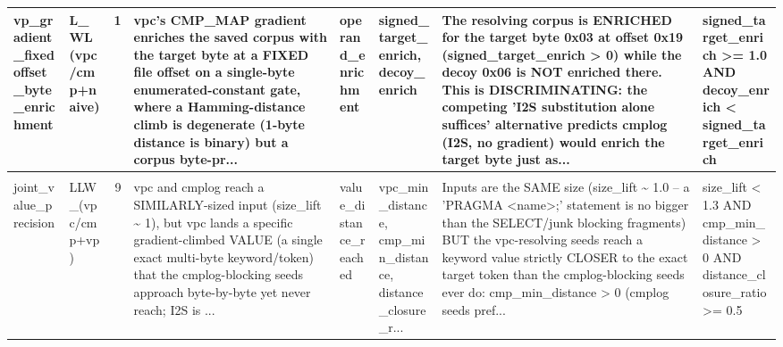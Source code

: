 \documentclass[7pt]{extarticle}
\begin{document}
{\begin{longtable}{@{}p{2.4cm}p{1.9cm}rp{4.3cm}p{1.5cm}p{1.7cm}p{4.6cm}p{3.0cm}@{}}
vp\_\allowbreak gradient\_\allowbreak fixedoffset\_\allowbreak byte\_\allowbreak enrichment & L\_\allowbreak WL (vpc/cmp+naive) & 1 & vpc's CMP\_\allowbreak MAP gradient enriches the saved corpus with the target byte at a FIXED file offset on a single-byte enumerated-constant gate, where a Hamming-distance climb is degenerate (1-byte distance is binary) but a corpus byte-pr... & operand\_\allowbreak enrichment & signed\_\allowbreak target\_\allowbreak enrich, decoy\_\allowbreak enrich & The resolving corpus is ENRICHED for the target byte 0x03 at offset 0x19 (signed\_\allowbreak target\_\allowbreak enrich \textgreater{} 0) while the decoy 0x06 is NOT enriched there. This is DISCRIMINATING: the competing 'I2S substitution alone suffices' alternative predicts cmplog (I2S, no gradient) would enrich the target byte just as... & signed\_\allowbreak target\_\allowbreak enrich \textgreater{}= 1.0 AND decoy\_\allowbreak enrich \textless{} signed\_\allowbreak target\_\allowbreak enrich\\
\midrule
\rowcolor{black!10}\multicolumn{8}{@{}l}{\textbf{[JOINT (I2SxVP)]\ \ joint\_\allowbreak value\_\allowbreak distance\_\allowbreak closure}\quad(final feature, n=18)}\\
joint\_\allowbreak value\_\allowbreak precision & LLW\_\allowbreak  (vpc/cmp+vp) & 9 & vpc and cmplog reach a SIMILARLY-sized input (size\_\allowbreak lift \textasciitilde{} 1), but vpc lands a specific gradient-climbed VALUE (a single exact multi-byte keyword/token) that the cmplog-blocking seeds approach byte-by-byte yet never reach; I2S is ... & value\_\allowbreak distance\_\allowbreak reached & vpc\_\allowbreak min\_\allowbreak distance, cmp\_\allowbreak min\_\allowbreak distance, distance\_\allowbreak closure\_\allowbreak r... & Inputs are the SAME size (size\_\allowbreak lift \textasciitilde{} 1.0 -- a 'PRAGMA \textless{}name\textgreater{};' statement is no bigger than the SELECT/junk blocking fragments) BUT the vpc-resolving seeds reach a keyword value strictly CLOSER to the exact target token than the cmplog-blocking seeds ever do: cmp\_\allowbreak min\_\allowbreak distance \textgreater{} 0 (cmplog seeds pref... & size\_\allowbreak lift \textless{} 1.3 AND cmp\_\allowbreak min\_\allowbreak distance \textgreater{} 0 AND distance\_\allowbreak closure\_\allowbreak ratio \textgreater{}= 0.5\\

\end{longtable}}
\end{document}
